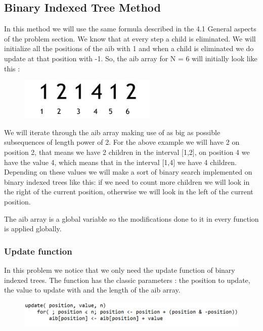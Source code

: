 \documentclass{article}
\begin{document}
\subsection{Binary Indexed Tree Method}

\indent In this method we will use the same formula described in the 4.1 General aspects of the problem section.
\newline
\indent We know that at every step a child is eliminated. We will initialize all the positions of the aib with 1 and when a child is eliminated we do update at that position with -1. So, the aib array for N = 6 will initially look like this :

\begin{figure}[h!]
\includegraphics[scale=0.7]{n=6example_aib.jpg}
\end{figure}

\indent We will iterate through the aib array making use of as big as possible subsequences of length power of 2. For the above example we will have 2 on position 2, that means we have 2 children in the interval $[$1,2$]$, on position 4 we have the value 4, which means that in the interval $[$1,4$]$ we have 4 children. Depending on these values we will make a sort of binary search implemented on binary indexed trees like this: if we need to count more children we will look in the right of the current position, otherwise we will look in the left of the current position.

The aib array is a global variable so the modifications done to it in every function is applied globally.

\subsubsection{Update function}
\indent In this problem we notice that we only need the update function of binary indexed trees. The function has the classic parameters :  the position to update, the value to update with and the length of the aib array.

\begin{figure}[h!]
\includegraphics[scale=0.7]{update_for_aib.png}
\end{figure}
\end{document}

